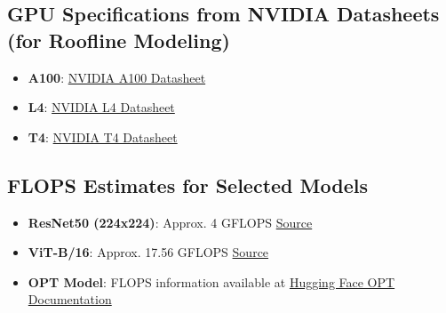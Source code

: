 \documentclass[11pt]{article}
\begin{document}


\subsection*{GPU Specifications from NVIDIA Datasheets (for Roofline Modeling)}
\begin{itemize}
    \item \textbf{A100}: \href{https://www.nvidia.com/content/dam/en-zz/Solutions/Data-Center/a100/pdf/nvidia-a100-datasheet.pdf}{NVIDIA A100 Datasheet}
    \item \textbf{L4}: \href{https://resources.nvidia.com/en-us-data-center-overview/l4-gpu-datasheet}{NVIDIA L4 Datasheet}
    \item \textbf{T4}: \href{https://www.nvidia.com/content/dam/en-zz/Solutions/Data-Center/tesla-t4/t4-tensor-core-datasheet-951643.pdf}{NVIDIA T4 Datasheet}
\end{itemize}

\subsection*{FLOPS Estimates for Selected Models}
\begin{itemize}
    \item \textbf{ResNet50 (224x224)}: Approx. 4 GFLOPS  
    \href{https://github.com/albanie/convnet-burden}{Source}
    \item \textbf{ViT-B/16}: Approx. 17.56 GFLOPS  
    \href{https://pytorch.org/vision/main/models/generated/torchvision.models.vit_b_16.html}{Source}
    \item \textbf{OPT Model}: FLOPS information available at  
    \href{https://huggingface.co/docs/transformers/en/model_doc/opt}{Hugging Face OPT Documentation}
\end{itemize}
\end{document}
